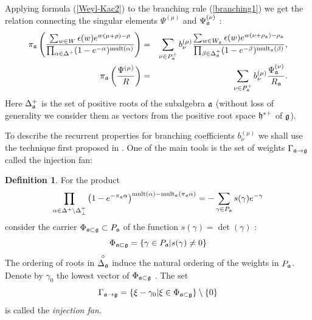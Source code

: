 \documentclass[12pt]{article}
\theoremstyle{definition}
\newtheorem{definition}{Definition}
\begin{document}
Applying formula (\ref{Weyl-Kac2}) to the branching rule (\ref{branching1})
we get the relation connecting the singular elements $\Psi ^{\left( \mu
\right) }$ and $\Psi _{\frak{a}}^{\left( \nu \right) }$ : 
\begin{eqnarray}
\pi _{\frak{a}}\left( \frac{\sum_{w \in W}\epsilon (w )e^{w (\mu +\rho
)-\rho }}{\prod_{\alpha \in \Delta ^{+}}(1-e^{-\alpha })^{\mathrm{mult}%
(\alpha )}}\right) &=&\sum_{\nu \in P_{\frak{a}}^{+}}b_{\nu }^{(\mu )}\frac{%
\sum_{w \in W_{\frak{a}}}\epsilon (w )e^{w (\nu +\rho _{\frak{a}})-\rho _{%
\frak{a}}}}{\prod_{\beta \in \Delta _{\frak{a}}^{+}}(1-e^{-\beta })^{\mathrm{%
mult}_{\frak{a}}(\beta )}},  \nonumber  \label{eq:4} \\
\pi _{\frak{a}}\left( \frac{\Psi ^{\left( \mu \right) }}{R}\right)
&=&\sum_{\nu \in P_{\frak{a}}^{+}}b_{\nu }^{(\mu )}\frac{\Psi _{\frak{a}%
}^{\left( \nu \right) }}{R_{\frak{a}}}.
\end{eqnarray}
Here $\Delta _{\frak{a}}^{+}$ is the set of positive roots of the subalgebra 
$\frak{a}$ (without loss of generality we consider them as vectors from the
positive root space $\frak{h}^{\ast +}$ of $\frak{g}$).

To describe the recurrent properties for branching coefficients $b_{\nu
}^{(\mu )}$ we shall use the technique first proposed in \cite{ilyin812pbc}.
One of the main tools is the set of weights $\Gamma _{\frak{a}\rightarrow 
\frak{g}}$ called the injection fan:

\begin{definition}
\label{fan-definition} For the product 
\begin{equation}
\prod_{\alpha \in \Delta ^{+}\setminus \Delta _{\bot }^{+}}\left( 1-e^{-\pi
_{\frak{a}}\alpha }\right) ^{\mathrm{mult}(\alpha )-\mathrm{mult}_{\frak{a}%
}(\pi _{\frak{a}}\alpha )}=-\sum_{\gamma \in P_{\frak{a}}}s(\gamma
)e^{-\gamma }  \label{eq:6}
\end{equation}
consider the carrier $\Phi _{\frak{a}\subset \frak{g}}\subset P_{\frak{a}}$
of the function $s(\gamma )=\det \left( \gamma \right) $ : 
\begin{equation}
\Phi _{\frak{a}\subset \frak{g}}=\left\{ \gamma \in P_{\frak{a}}|s(\gamma
)\neq 0\right\}   \label{eq:37}
\end{equation}
The ordering of roots in $\stackrel{\circ }{\Delta _{\frak{a}}}$ induce the
natural ordering of the weights in $P_{\frak{a}}$. Denote by $\gamma _{0}$
the lowest vector of $\Phi _{\frak{a}\subset \frak{g}}$ . The set 
\begin{equation}
\Gamma _{\frak{a}\rightarrow \frak{g}}=\left\{ \xi -\gamma _{0}|\xi \in \Phi
_{\frak{a}\subset \frak{g}}\right\} \setminus \left\{ 0\right\} 
\label{fan-defined}
\end{equation}
is called the \textit{injection fan}.
\end{definition}
\end{document}
